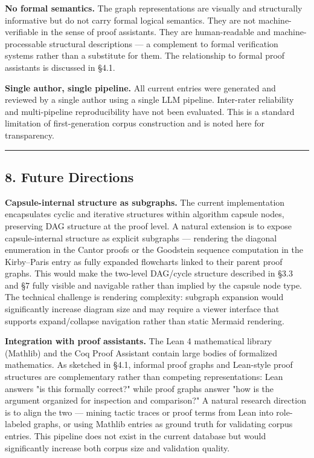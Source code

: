 \documentclass[
  11pt]{article}
\begin{document}
\textbf{No formal semantics.} The graph representations are visually and
structurally informative but do not carry formal logical semantics. They
are not machine-verifiable in the sense of proof assistants. They are
human-readable and machine-processable structural descriptions --- a
complement to formal verification systems rather than a substitute for
them. The relationship to formal proof assistants is discussed in §4.1.

\textbf{Single author, single pipeline.} All current entries were
generated and reviewed by a single author using a single LLM pipeline.
Inter-rater reliability and multi-pipeline reproducibility have not been
evaluated. This is a standard limitation of first-generation corpus
construction and is noted here for transparency.

\begin{center}\rule{0.5\linewidth}{0.5pt}\end{center}

\hypertarget{8-future-directions}{%
\subsection{8. Future Directions}\label{8-future-directions}}

\textbf{Capsule-internal structure as subgraphs.} The current
implementation encapsulates cyclic and iterative structures within
algorithm capsule nodes, preserving DAG structure at the proof level. A
natural extension is to expose capsule-internal structure as explicit
subgraphs --- rendering the diagonal enumeration in the Cantor proofs or
the Goodstein sequence computation in the Kirby--Paris entry as fully
expanded flowcharts linked to their parent proof graphs. This would make
the two-level DAG/cycle structure described in §3.3 and §7 fully visible
and navigable rather than implied by the capsule node type. The
technical challenge is rendering complexity: subgraph expansion would
significantly increase diagram size and may require a viewer interface
that supports expand/collapse navigation rather than static Mermaid
rendering.

\textbf{Integration with proof assistants.} The Lean 4 mathematical
library (Mathlib) and the Coq Proof Assistant contain large bodies of
formalized mathematics. As sketched in §4.1, informal proof graphs and
Lean-style proof structures are complementary rather than competing
representations: Lean answers "is this formally correct?" while proof
graphs answer "how is the argument organized for inspection and
comparison?" A natural research direction is to align the two --- mining
tactic traces or proof terms from Lean into role-labeled graphs, or
using Mathlib entries as ground truth for validating corpus entries.
This pipeline does not exist in the current database but would
significantly increase both corpus size and validation quality.
\end{document}
